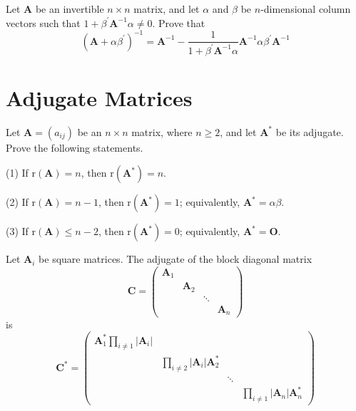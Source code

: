 \documentclass[12pt, a4paper, oneside]{book}
\begin{document}
\begin{corollary}
    Let $\mathbf{A}$ be an invertible $n \times n$ matrix, and let ${\alpha}$ and ${\beta}$ be $n$-dimensional column vectors such that $1+{\beta}^{\prime} \mathbf{A}^{-1} {\alpha} \neq 0$. Prove that
    \[
        \left(\mathbf{A}+{\alpha} {\beta}^{\prime}\right)^{-1}=\mathbf{A}^{-1}-\frac{1}{1+{\beta}^{\prime} \mathbf{A}^{-1} {\alpha}} \mathbf{A}^{-1} {\alpha} {\beta}^{\prime} \mathbf{A}^{-1}
    \]
\end{corollary}

\section{Adjugate Matrices}

\begin{theorem}
    Let $\mathbf{A}=\left(a_{i j}\right)$ be an $n \times n$ matrix, where $n \geq 2$, and let $\mathbf{A}^*$ be its adjugate. Prove the following statements.

    (1) If $\mathrm{r}(\mathbf{A})=n$, then $\mathrm{r}\left(\mathbf{A}^*\right)=n$.

    (2) If $\mathrm{r}(\mathbf{A})=n-1$, then $\mathrm{r}\left(\mathbf{A}^*\right)=1$; equivalently, $\mathbf{A}^*={\alpha} {\beta}$.

    (3) If $\mathrm{r}(\mathbf{A}) \leq n-2$, then $\mathrm{r}\left(\mathbf{A}^*\right)=0$; equivalently, $\mathbf{A}^*=\mathbf{O}$.
\end{theorem}

\begin{theorem}
    Let $\mathbf{A}_i$ be square matrices. The adjugate of the block diagonal matrix
    \[
        \mathbf{C}=
        \left(\begin{matrix}
                \mathbf{A}_1 &              &        &              \\
                             & \mathbf{A}_2 &        &              \\
                             &              & \ddots &              \\
                             &              &        & \mathbf{A}_n
            \end{matrix}\right)
    \]
    is
    \[
        \mathbf{C}^*=
        \left(\begin{matrix}
                \mathbf{A}_1^*\prod\limits_{i\neq 1}
                \left|\mathbf{A}_i\right|               &                        &        &                        \\
                                                        & \prod\limits_{i\neq 2}
                \left|\mathbf{A}_i\right|\mathbf{A}_2^* &                        &                                 \\
                                                        &                        & \ddots &                        \\
                                                        &                        &        & \prod\limits_{i\neq 1}
                \left|\mathbf{A}_n\right|\mathbf{A}_n^*
            \end{matrix}\right)
    \]
\end{theorem}
\end{document}
